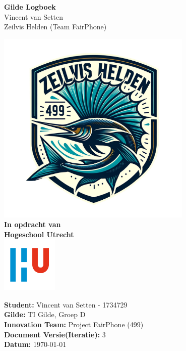 \documentclass[a4paper]{report}
\newcommand{\latestVersion}{3}
\begin{document}
\begin{titlepage}
  \begin{center}
      \vspace*{.6cm}
      \Huge
      \textbf{ Gilde Logboek }\\
      \vspace{0.2cm}
      \small Vincent van Setten \\
      \small Zeilvis Helden (Team FairPhone)

      \normalsize


      \vspace{1cm}
      \includegraphics[width=0.7\textwidth]{Images/zeilvis_helden.png}
      \vspace{1cm}
      \Large\\
      \textbf{In opdracht van}\\
      \large
      \textbf{Hogeschool Utrecht} \\
      \includegraphics[width=0.2\textwidth]{Images/logouni.png}


      \vfill
    \end{center}
      \textbf{Student:} Vincent van Setten - 1734729 \\
      \textbf{Gilde:} TI Gilde, Groep D\\
      \textbf{Innovation Team:} Project FairPhone (499) \\
      \textbf{Document Versie(Iteratie):} \latestVersion \\
      \textbf{Datum:} \today \\
      \vspace{2cm}
\end{titlepage}
\end{document}
